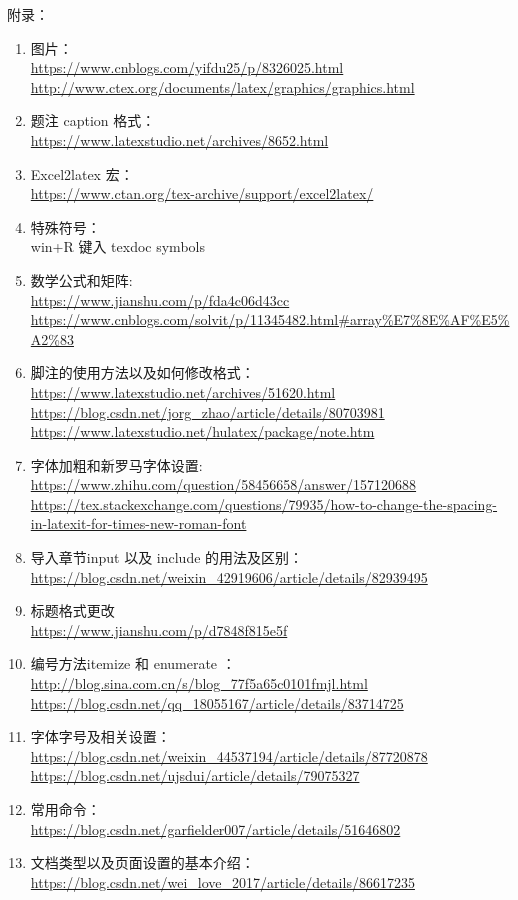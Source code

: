 附录：
\begin{enumerate}
\item 图片：\\		
	\url{https://www.cnblogs.com/yifdu25/p/8326025.html}\\		
	\url{http://www.ctex.org/documents/latex/graphics/graphics.html}
\item 题注 caption 格式：\\
	\url{https://www.latexstudio.net/archives/8652.html}
\item Excel2latex 宏：\\
	\url{https://www.ctan.org/tex-archive/support/excel2latex/}
\item 特殊符号：\\
	win+R 键入 texdoc symbols
\item 数学公式和矩阵:\\
	\url{https://www.jianshu.com/p/fda4c06d43cc}\\
	\url{https://www.cnblogs.com/solvit/p/11345482.html#array\%E7\%8E\%AF\%E5\%A2\%83}
\item 脚注的使用方法以及如何修改格式：\\
	\url{https://www.latexstudio.net/archives/51620.html}\\
	\url{https://blog.csdn.net/jorg_zhao/article/details/80703981}\\
	\url{https://www.latexstudio.net/hulatex/package/note.htm}
\item 字体加粗和新罗马字体设置:\\
	\url{https://www.zhihu.com/question/58456658/answer/157120688}\\
	\url{https://tex.stackexchange.com/questions/79935/how-to-change-the-spacing-in-latexit-for-times-new-roman-font}
\item 导入章节input 以及 include 的用法及区别：\\		
	\url{https://blog.csdn.net/weixin_42919606/article/details/82939495}	
\item  标题格式更改\\		
	\url{https://www.jianshu.com/p/d7848f815e5f}		
\item 编号方法itemize 和 enumerate ：\\		
	\url{http://blog.sina.com.cn/s/blog_77f5a65c0101fmjl.html}\\		
	\url{https://blog.csdn.net/qq_18055167/article/details/83714725}		
\item \label{字体字号} 字体字号及相关设置：\\		
	\url{https://blog.csdn.net/weixin_44537194/article/details/87720878}\\	
	\url{https://blog.csdn.net/ujsdui/article/details/79075327}
\item 常用命令：\\		
	\url{https://blog.csdn.net/garfielder007/article/details/51646802}
\item 文档类型以及页面设置的基本介绍：\\
	\url{https://blog.csdn.net/wei_love_2017/article/details/86617235}
\end{enumerate}	